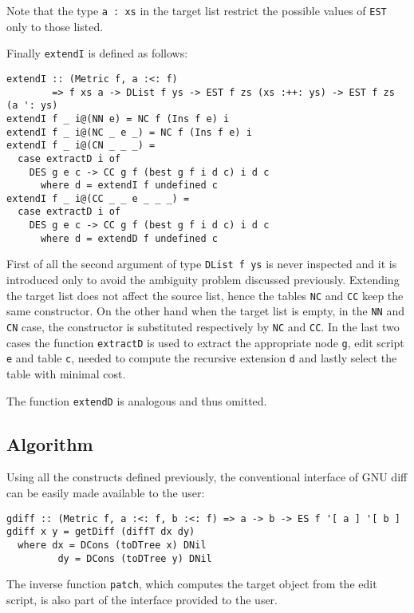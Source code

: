 \documentclass[../Thesis.tex]{subfiles}
\begin{document}
	Note that the type \texttt{a : xs} in the target list restrict the possible
	values of \texttt{EST} only to those listed.

	Finally \texttt{extendI} is defined as follows:
	
\begin{verbatim}	
extendI :: (Metric f, a :<: f)
        => f xs a -> DList f ys -> EST f zs (xs :++: ys) -> EST f zs (a ': ys)
extendI f _ i@(NN e) = NC f (Ins f e) i
extendI f _ i@(NC _ e _) = NC f (Ins f e) i
extendI f _ i@(CN _ _ _) =
  case extractD i of
    DES g e c -> CC g f (best g f i d c) i d c
      where d = extendI f undefined c
extendI f _ i@(CC _ _ e _ _ _) =
  case extractD i of
    DES g e c -> CC g f (best g f i d c) i d c
      where d = extendD f undefined c
\end{verbatim}

	First of all the second argument of type \texttt{DList f ys} is never inspected
	and it is introduced only to avoid the ambiguity problem discussed 
	previously.
	Extending the target list does not affect the source list, hence
	the tables \texttt{NC} and \texttt{CC} keep the same constructor.
	On the other hand when the target list is empty, in the \texttt{NN} and
	\texttt{CN} case, the constructor is substituted respectively by
	\texttt{NC} and \texttt{CC}.
	In the last two cases the function \texttt{extractD} is used to extract
	the appropriate node \texttt{g}, edit script \texttt{e} and table
	\texttt{c}, needed to compute the recursive extension \texttt{d}
	and lastly select the table with minimal cost.
		
	The function \texttt{extendD} is analogous and thus omitted.

	\subsection{Algorithm}
	\label{subsec:HaskellAlgo}
	Using all the constructs defined previously, the conventional
	interface of GNU diff can be easily made available to the
	user:

\begin{verbatim}
gdiff :: (Metric f, a :<: f, b :<: f) => a -> b -> ES f '[ a ] '[ b ]
gdiff x y = getDiff (diffT dx dy)
  where dx = DCons (toDTree x) DNil
         dy = DCons (toDTree y) DNil
\end{verbatim}
	
	The inverse function \texttt{patch}, which computes the target
	object from the edit script, is also part of the interface
	provided to the user.
\end{document}
